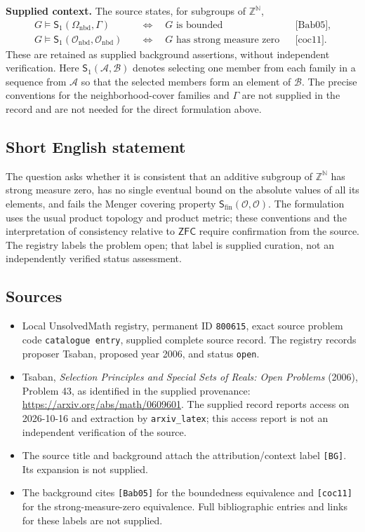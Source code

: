 \documentclass[11pt]{article}
\newcommand{\N}{\mathbb{N}}
\newcommand{\Z}{\mathbb{Z}}
\begin{document}
\textbf{Supplied context.} The source states, for subgroups of $\Z^{\N}$,
\[
\begin{aligned}
G\models\mathsf S_1(\Omega_{\mathrm{nbd}},\Gamma)
&\quad\Longleftrightarrow\quad G\text{ is bounded}
&&\text{[Bab05]},\\
G\models\mathsf S_1(\mathcal O_{\mathrm{nbd}},\mathcal O_{\mathrm{nbd}})
&\quad\Longleftrightarrow\quad G\text{ has strong measure zero}
&&\text{[coc11]}.
\end{aligned}
\]
These are retained as supplied background assertions, without independent verification. Here $\mathsf S_1(\mathcal A,\mathcal B)$ denotes selecting one member from each family in a sequence from $\mathcal A$ so that the selected members form an element of $\mathcal B$. The precise conventions for the neighborhood-cover families and $\Gamma$ are not supplied in the record and are not needed for the direct formulation above.
\subsection{Short English statement}
The question asks whether it is consistent that an additive subgroup of $\Z^{\N}$ has strong measure zero, has no single eventual bound on the absolute values of all its elements, and fails the Menger covering property $\mathsf S_{\mathrm{fin}}(\mathcal O,\mathcal O)$. The formulation uses the usual product topology and product metric; these conventions and the interpretation of consistency relative to $\mathsf{ZFC}$ require confirmation from the source. The registry labels the problem open; that label is supplied curation, not an independently verified status assessment.
\subsection{Sources}
\begin{itemize}
\item Local UnsolvedMath registry, permanent ID \texttt{800615}, exact source problem code \texttt{catalogue entry}, supplied complete source record. The registry records proposer Tsaban, proposed year 2006, and status \texttt{open}.
\item Tsaban, \emph{Selection Principles and Special Sets of Reals: Open Problems} (2006), Problem 43, as identified in the supplied provenance: \url{https://arxiv.org/abs/math/0609601}. The supplied record reports access on 2026-10-16 and extraction by \texttt{arxiv\_latex}; this access report is not an independent verification of the source.
\item The source title and background attach the attribution/context label \texttt{[BG]}. Its expansion is not supplied.
\item The background cites \texttt{[Bab05]} for the boundedness equivalence and \texttt{[coc11]} for the strong-measure-zero equivalence. Full bibliographic entries and links for these labels are not supplied.
\end{itemize}
\end{document}
